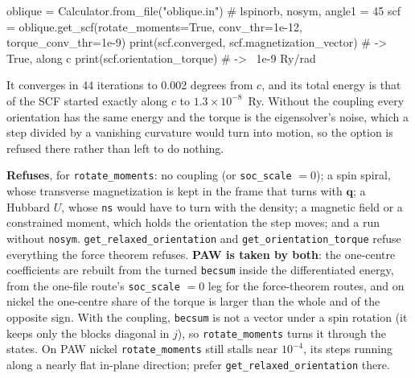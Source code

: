 \documentclass[11pt,a4paper]{article}
\newcommand{\code}[1]{\texttt{\small #1}}
\begin{document}
\begin{pycode}
oblique = Calculator.from_file("oblique.in")     # lspinorb, nosym, angle1 = 45
scf = oblique.get_scf(rotate_moments=True, conv_thr=1e-12, torque_conv_thr=1e-9)
print(scf.converged, scf.magnetization_vector)   # -> True, along c
print(scf.orientation_torque)                    # -> ~1e-9 Ry/rad
\end{pycode}

\noindent It converges in 44 iterations to 0.002 degrees from $c$, and its total
energy is that of the SCF started exactly along $c$ to $1.3\times10^{-8}$~Ry.
Without the coupling every orientation has the same energy and the torque is the
eigensolver's noise, which a step divided by a vanishing curvature would turn
into motion, so the option is refused there rather than left to do nothing.

\begin{refuses}
\textbf{Refuses}, for \code{rotate\_moments}: no coupling (or \code{soc\_scale}
$=0$); a spin spiral, whose transverse magnetization is kept in the frame that
turns with $\mathbf q$; a Hubbard $U$, whose \code{ns} would have to turn with the
density; a magnetic field or a constrained moment, which holds the orientation
the step moves; and a run without \code{nosym}. \code{get\_relaxed\_orientation}
and \code{get\_orientation\_torque} refuse everything the force theorem refuses.
\textbf{PAW is taken by both}: the one-centre coefficients are rebuilt from the
turned \code{becsum} inside the differentiated energy, from the one-file route's
\code{soc\_scale} $=0$ leg for the force-theorem routes, and on nickel the
one-centre share of the torque is larger than the whole and of the opposite
sign. With the coupling, \code{becsum} is not a vector under a spin rotation
(it keeps only the blocks diagonal in $j$), so \code{rotate\_moments} turns it
through the states. On PAW nickel \code{rotate\_moments} still stalls near
$10^{-4}$, its steps running along a nearly flat in-plane direction; prefer
\code{get\_relaxed\_orientation} there.
\end{refuses}
\end{document}
